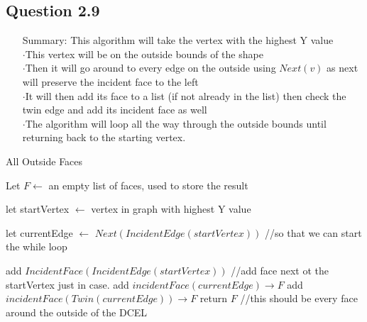 \documentclass[12pt]{article}
\begin{document}
\subsection*{Question 2.9}
\begin{itemize}
    \item[Summary:] This algorithm will take the vertex with the highest Y value
    \\ $\cdot $This vertex will be on the outside bounds of the shape
    \\ $\cdot $Then it will go around to every edge on the outside using $Next(v)$ as next will preserve the incident face to the left
    \\ $\cdot$It will then add its face to a list (if not already in the list) then check the twin edge and add its incident face as well
    \\ $\cdot$The algorithm will loop all the way through the outside bounds until returning back to the starting vertex.
\end{itemize}
\begin{algorithm} \caption{All Outside Faces}
    \begin{algorithmic}[] 
    \item Let $F \leftarrow$ an empty list of faces, used to store the result
    \item let startVertex $\leftarrow$ vertex in graph with highest Y value
    \item let currentEdge $\leftarrow$ $Next(IncidentEdge(startVertex))$ 
    \State \hspace*{.5cm}//so that we can start the while loop
    \item add $IncidentFace(IncidentEdge(startVertex))$ 
    \State \hspace*{.5cm} //add face next ot the startVertex just in case.
    \newline
        \State add $incidentFace(currentEdge) \rightarrow F$
        \EndIf
        \State add $incidentFace(Twin(currentEdge)) \rightarrow F$
        \EndIf
\EndWhile
\newline
    \State return $F$ //this should be every face around the outside of the DCEL
    \end{algorithmic} \end{algorithm}
\begin{itemize}
    \item[]
\end{itemize}
\end{document}
